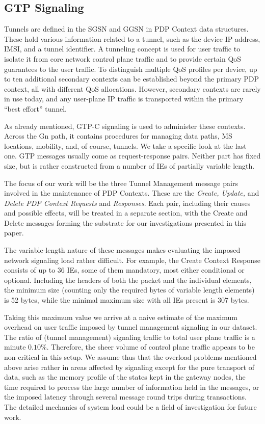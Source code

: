 \subsection{GTP Signaling}


Tunnels are defined in the \ac{SGSN} and \ac{GGSN} in \ac{PDP} Context data structures. These hold various information related to a tunnel, such as the device IP address, \ac{IMSI}, and a tunnel identifier. A tunneling concept is used for user traffic to isolate it from core network control plane traffic and to provide certain \ac{QoS} guarantees to the user traffic. To distinguish multiple \ac{QoS} profiles per device, up to ten additional secondary contexts can be established beyond the primary PDP context, all with different \ac{QoS} allocations. However, secondary contexts are rarely in use today, and any user-plane IP traffic is transported within the primary ``best effort'' tunnel.

As already mentioned, GTP-C signaling is used to administer these contexts. Across the Gn path, it contains procedures for managing data paths, \ac{MS} locations, mobility, and, of course, tunnels. We take a specific look at the last one. \ac{GTP} messages usually come as request-response pairs. Neither part has fixed size, but is rather constructed from a number of \acp{IE} of partially variable length. 

The focus of our work will be the three Tunnel Management message pairs involved in the maintenance of PDP Contexts. These are the \textit{Create, Update,} and \textit{Delete PDP Context Requests} and \textit{Responses}. Each pair, including their causes and possible effects, will be treated in a separate section, with the Create and Delete messages forming the substrate for our investigations presented in this paper.

The variable-length nature of these messages makes evaluating the imposed network signaling load rather difficult. For example, the Create Context Response consists of up to 36 \acp{IE}, some of them mandatory, most either conditional or optional. Including the headers of both the packet and the individual elements, the minimum size (counting only the required bytes of variable length elements) is 52 bytes, while the minimal maximum size with all \acp{IE} present is 307 bytes.

Taking this maximum value we arrive at a naive estimate of the maximum overhead on user traffic imposed by tunnel management signaling in our dataset. The ratio of (tunnel management) signaling traffic to total user plane traffic is a minute $0.10\%$. Therefore, the sheer volume of control plane traffic appears to be non-critical in this setup. We assume thus that the overload problems mentioned above arise rather in areas affected by signaling except for the pure transport of data, such as the memory profile of the states kept in the gateway nodes, the time required to process the large number of information held in the messages, or the imposed latency through several message round trips during transactions. The detailed mechanics of system load could be a field of investigation for future work.




